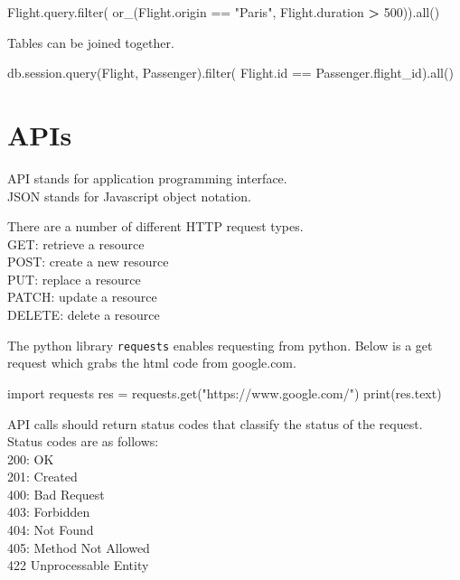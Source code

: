 \documentclass[]{book}
\newenvironment{Shaded}{\begin{snugshade}}{\end{snugshade}}
\newcommand{\StringTok}[1]{\textcolor[rgb]{0.31,0.60,0.02}{#1}}
\newcommand{\OperatorTok}[1]{\textcolor[rgb]{0.81,0.36,0.00}{\textbf{#1}}}
\newcommand{\ExtensionTok}[1]{#1}
\newcommand{\NormalTok}[1]{#1}
\begin{document}
\begin{Shaded}
\begin{Highlighting}[]
\ExtensionTok{Flight.query.filter}\NormalTok{(}
    \ExtensionTok{or_}\NormalTok{(Flight.origin == }\StringTok{"Paris"}\NormalTok{,}
        \ExtensionTok{Flight.duration} \OperatorTok{>}\NormalTok{ 500))}\ExtensionTok{.all}\NormalTok{()}
\end{Highlighting}
\end{Shaded}

Tables can be joined together.

\begin{Shaded}
\begin{Highlighting}[]
\ExtensionTok{db.session.query}\NormalTok{(Flight, Passenger)}\ExtensionTok{.filter}\NormalTok{(}
    \ExtensionTok{Flight.id}\NormalTok{ == Passenger.flight_id)}\ExtensionTok{.all}\NormalTok{()}
\end{Highlighting}
\end{Shaded}

\section{APIs}\label{apis}

API stands for application programming interface.\\
JSON stands for Javascript object notation.

There are a number of different HTTP request types.\\
GET: retrieve a resource\\
POST: create a new resource\\
PUT: replace a resource\\
PATCH: update a resource\\
DELETE: delete a resource

The python library \texttt{requests} enables requesting from python.
Below is a get request which grabs the html code from google.com.

\begin{Shaded}
\begin{Highlighting}[]
\ExtensionTok{import}\NormalTok{ requests}
\ExtensionTok{res}\NormalTok{ = requests.get(}\StringTok{"https://www.google.com/"}\NormalTok{)}
\ExtensionTok{print}\NormalTok{(res.text)                              }
\end{Highlighting}
\end{Shaded}

API calls should return status codes that classify the status of the
request.\\
Status codes are as follows:\\
200: OK\\
201: Created\\
400: Bad Request\\
403: Forbidden\\
404: Not Found\\
405: Method Not Allowed\\
422 Unprocessable Entity
\end{document}
